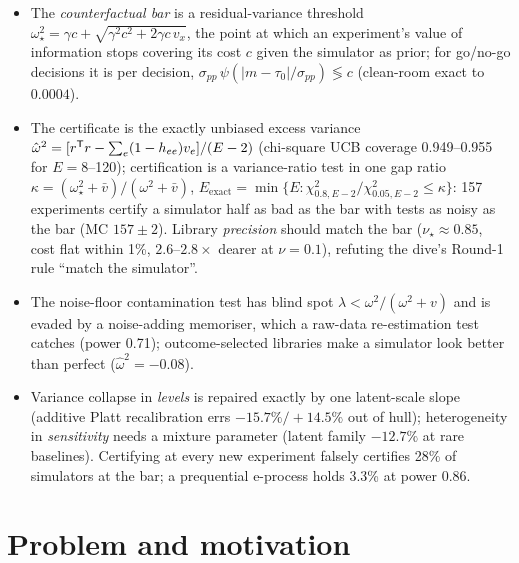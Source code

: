 \begin{keyideas}
\begin{itemize}
\item The \emph{counterfactual bar} is a residual-variance threshold $\omega_\star^2 = \gamma c + \sqrt{\gamma^2 c^2 + 2\gamma c\,v_x}$, the point at which an experiment's value of information stops covering its cost $c$ given the simulator as prior; for go/no-go decisions it is per decision, $\sigma_{pp}\,\psi(|m - \tau_0|/\sigma_{pp}) \lessgtr c$ (clean-room exact to $0.0004$).
\item The certificate is the exactly unbiased excess variance $\hat\omega^2 = [r^{\mathsf{T}} r - \sum_e (1 - h_{ee}) v_e]/(E - 2)$ (chi-square UCB coverage 0.949--0.955 for $E = 8$--120); certification is a variance-ratio test in one gap ratio $\kappa = (\omega_\star^2 + \bar v)/(\omega^2 + \bar v)$, $E_{\mathrm{exact}} = \min\{E : \chi^2_{0.8, E-2}/\chi^2_{0.05, E-2} \le \kappa\}$: 157 experiments certify a simulator half as bad as the bar with tests as noisy as the bar (MC $157 \pm 2$). Library \emph{precision} should match the bar ($\nu_\star \approx 0.85$, cost flat within 1\%, $2.6$--$2.8\times$ dearer at $\nu = 0.1$), refuting the dive's Round-1 rule ``match the simulator''.
\item The noise-floor contamination test has blind spot $\lambda < \omega^2/(\omega^2 + v)$ and is evaded by a noise-adding memoriser, which a raw-data re-estimation test catches (power 0.71); outcome-selected libraries make a simulator look better than perfect ($\hat\omega^2 = -0.08$).
\item Variance collapse in \emph{levels} is repaired exactly by one latent-scale slope (additive Platt recalibration errs $-15.7\%/+14.5\%$ out of hull); heterogeneity in \emph{sensitivity} needs a mixture parameter (latent family $-12.7\%$ at rare baselines). Certifying at every new experiment falsely certifies 28\% of simulators at the bar; a prequential e-process holds 3.3\% at power 0.86.
\end{itemize}
\end{keyideas}

\section{Problem and motivation}

